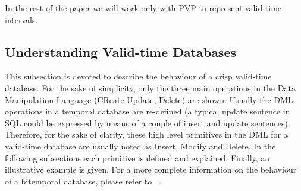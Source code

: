 In the rest of the paper we will work only with PVP to represent valid-time intervals.


\subsection{\label{subsubsec:Understanding-valid-time-databases}Understanding Valid-time Databases}
This subsection is devoted to describe the behaviour of a crisp valid-time database. For the sake of simplicity, only the three main operations in the Data Manipulation Language (CReate Update, Delete) are shown. Usually the DML operations in a temporal database are re-defined (a typical update sentence in SQL could be expressed by means of a couple of insert and update sentences). Therefore, for the sake of clarity, these high level primitives in the DML for a valid-time database are usually noted as Insert, Modify and Delete. In the following subsections each primitive is defined and explained. Finally, an illustrative example is given. For a more complete information on the behaviour of a bitemporal database, please refer to ~\cite{Jensen1994}.

